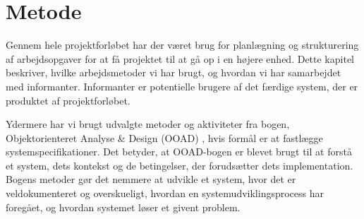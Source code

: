 \chapter{Metode}
\label{chap:metode}

Gennem hele projektforløbet har der været brug for planlægning og strukturering af arbejdsopgaver for at få projektet til at gå op i en højere enhed. Dette kapitel beskriver, hvilke arbejdsmetoder vi har brugt, og hvordan vi har samarbejdet med informanter. Informanter er potentielle brugere af det færdige system, der er produktet af projektforløbet.

Ydermere har vi brugt udvalgte metoder og aktiviteter fra bogen, Objektorienteret Analyse \& Design (OOAD) \cite{ooad}, hvis formål er at fastlægge systemspecifikationer. Det betyder, at OOAD-bogen er blevet brugt til at forstå et system, dets kontekst og de betingelser, der forudsætter dets implementation. Bogens metoder gør det nemmere at udvikle et system, hvor det er veldokumenteret og overskueligt, hvordan en systemudviklingsprocess har foregået, og hvordan systemet løser et givent problem.




